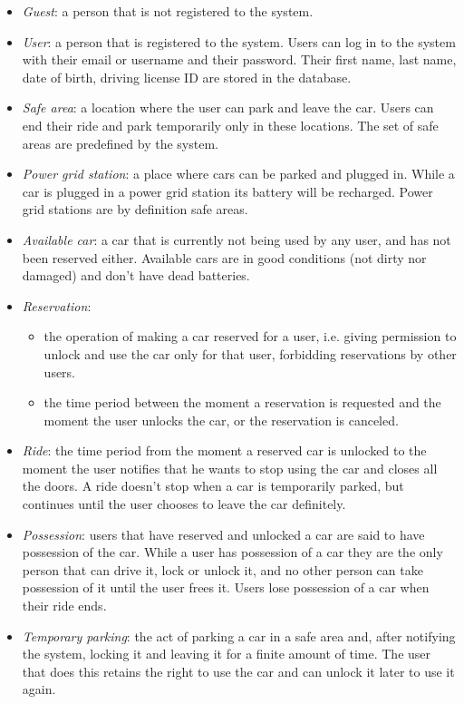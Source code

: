 \documentclass[english]{article}
\begin{document}
\begin{itemize}
\item{\textit{Guest}: a person that is not registered to the system.}
\item{\textit{User}: a person that is registered to the system. Users can log in to the system with their email or username and their password. Their first name, last name, date of birth, driving license ID are stored in the database.}
\item{\textit{Safe area}: a location where the user can park and leave the car. Users can end their ride and park temporarily only in these locations. The set of safe areas are predefined by the system.}
\item{\textit{Power grid station}: a place where cars can be parked and plugged in. While a car is plugged in a power grid station its battery will be recharged. Power grid stations are by definition safe areas.}
\item{\textit{Available car}: a car that is currently not being used by any user, and has not been reserved either. Available cars are in good conditions (not dirty nor damaged) and don’t have dead batteries.}
\item{\textit{Reservation}:
	\begin{itemize}
		\item{the operation of making a car reserved for a user, i.e. giving permission to unlock and use the car only for that user, forbidding reservations by other users.}
		\item{the time period between the moment a reservation is requested and the moment the user unlocks the car, or the reservation is canceled.}
	\end{itemize}
}
\item{\textit{Ride}: the time period from the moment a reserved car is unlocked to the moment the user notifies that he wants to stop using the car and closes all the doors. A ride doesn’t stop when a car is temporarily parked, but continues until the user chooses to leave the car definitely.}
\item{\textit{Possession}: users that have reserved and unlocked a car are said to have possession of the car. While a user has possession of a car they are the only person that can drive it, lock or unlock it, and no other person can take possession of it until the user frees it. Users lose possession of a car when their ride ends.}
\item{\textit{Temporary parking}: the act of parking a car in a safe area and, after notifying the system, locking it and leaving it for a finite amount of time. The user that does this retains the right to use the car and can unlock it later to use it again.}

\end{itemize}
\end{document}
